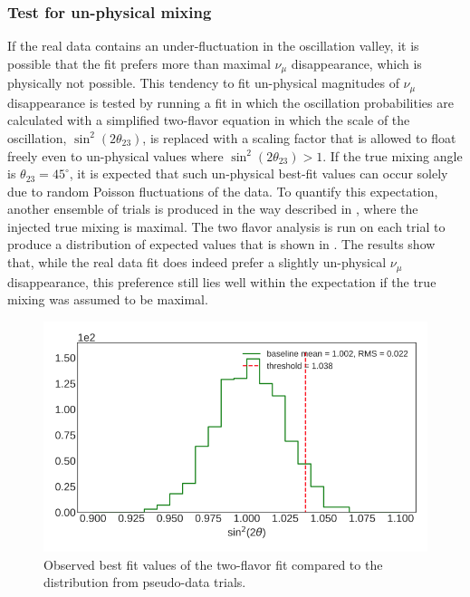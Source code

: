 \subsubsection{Test for un-physical mixing}
If the real data contains an under-fluctuation in the oscillation valley, it is possible that the fit prefers more than maximal $\nu_\mu$ disappearance, which is physically not possible. This tendency to fit un-physical magnitudes of $\nu_\mu$ disappearance is tested by running a fit in which the oscillation probabilities are calculated with a simplified two-flavor equation in which the scale of the oscillation, $\sin^2(2\theta_{23})$, is replaced with a scaling factor that is allowed to float freely even to un-physical values where $\sin^2(2\theta_{23}) > 1$. If the true mixing angle is $\theta_{23}=45^\circ$, it is expected that such un-physical best-fit values can occur solely due to random Poisson fluctuations of the data. To quantify this expectation, another ensemble of trials is produced in the way described in , where the injected true mixing is maximal. The two flavor analysis is run on each trial to produce a distribution of expected values that is shown in . The results show that, while the real data fit does indeed prefer a slightly un-physical $\nu_\mu$ disappearance, this preference still lies well within the expectation if the true mixing was assumed to be maximal.

\begin{figure}
    \centering
    \includegraphics[width=0.8\linewidth]{figures/measurement/three_flavor/ensemble_pre_fit/two_flav_ensemble_threshold.png}
    \caption{Observed best fit values of the two-flavor fit compared to the distribution from pseudo-data trials.}
    \label{fig:two-flavor-ensemble}
\end{figure}

